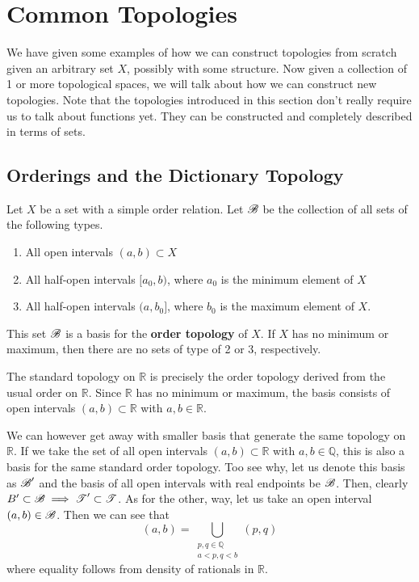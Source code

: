\section{Common Topologies} 

  We have given some examples of how we can construct topologies from scratch given an arbitrary set $X$, possibly with some structure. Now given a collection of 1 or more topological spaces, we will talk about how we can construct new topologies. Note that the topologies introduced in this section don't really require us to talk about functions yet. They can be constructed and completely described in terms of sets. 

\subsection{Orderings and the Dictionary Topology}

  \begin{definition}
    Let $X$ be a set with a simple order relation. Let $\B$ be the collection of all sets of the following types. 
    \begin{enumerate}
      \item All open intervals $(a, b) \subset X$
      \item All half-open intervals $[a_0, b)$, where $a_0$ is the minimum element of $X$
      \item All half-open intervals $(a, b_0]$, where $b_0$ is the maximum element of $X$. 
    \end{enumerate}
    This set $\B$ is a basis for the \textbf{order topology} of $X$. If $X$ has no minimum or maximum, then there are no sets of type of 2 or 3, respectively. 
  \end{definition}

  \begin{example}
    The standard topology on $\mathbb{R}$ is precisely the order topology derived from the usual order on $\mathbb{R}$. Since $\mathbb{R}$ has no minimum or maximum, the basis consists of open intervals $(a, b) \subset \mathbb{R}$ with $a, b \in \mathbb{R}$. 
  \end{example}

  \begin{example}
    We can however get away with smaller basis that generate the same topology on $\mathbb{R}$. If we take the set of all open intervals $(a, b) \subset \mathbb{R}$ with $a, b \in \mathbb{Q}$, this is also a basis for the same standard order topology. Too see why, let us denote this basis as $\B^\prime$ and the basis of all open intervals with real endpoints be $\B$. Then, clearly $B^\prime \subset \B \implies \T^\prime \subset \T$. As for the other, way, let us take an open interval $(a, b) \in \B$. Then we can see that 
    \begin{equation}
      (a, b) = \bigcup_{\substack{p, q \in \mathbb{Q} \\ a < p, q < b}} (p, q)
    \end{equation}
    where equality follows from density of rationals in $\mathbb{R}$. 
  \end{example}

